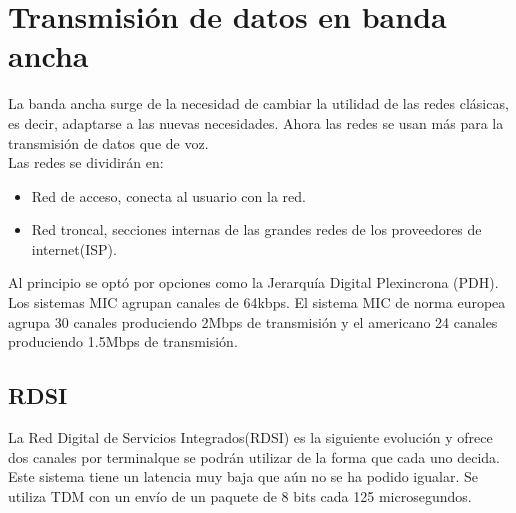 \section{Transmisión de datos en banda ancha}
La banda ancha surge de la necesidad de cambiar la utilidad de las redes clásicas, es decir, adaptarse a las nuevas necesidades. Ahora las redes se usan más para la transmisión de datos que de voz.\\
Las redes se dividirán en:
\begin{itemize}
\item Red de acceso, conecta al usuario con la red.
\item Red troncal, secciones internas de las grandes redes de los proveedores de internet(\acrshort{ISP}).
\end{itemize}
Al principio se optó por opciones como la Jerarquía Digital Plexincrona (\acrshort{PDH}). Los sistemas MIC agrupan canales de 64kbps. El sistema MIC de norma europea agrupa 30 canales produciendo 2Mbps de transmisión y el americano 24 canales produciendo 1.5Mbps de transmisión.
\subsection{\acrshort{RDSI}}
La Red Digital de Servicios Integrados(\acrshort{RDSI}) es la siguiente evolución y ofrece dos canales por terminalque se podrán utilizar de la forma que cada uno decida. Este sistema tiene un latencia muy baja que aún no se ha podido igualar. Se utiliza \acrshort{TDM} con un envío de un paquete de 8 bits cada 125 microsegundos.
